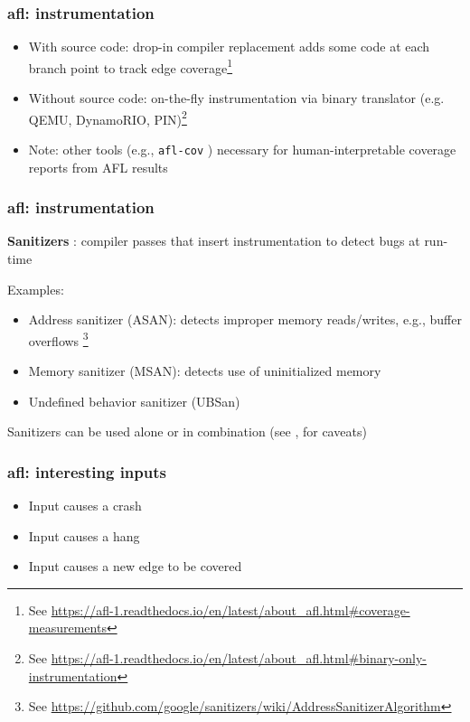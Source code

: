 \documentclass{beamer}
\begin{document}
\begin{frame}
	\frametitle{afl: instrumentation}
	
	\begin{itemize}
		\item{With source code: drop-in compiler replacement adds some code at each branch point to track edge coverage\footnote{See \url{https://afl-1.readthedocs.io/en/latest/about\_afl.html\#coverage-measurements}}}

		\item{Without source code: on-the-fly instrumentation via binary translator (e.g. QEMU, DynamoRIO, PIN)\footnote{See \url{https://afl-1.readthedocs.io/en/latest/about\_afl.html\#binary-only-instrumentation}}} 
		
		\item{Note: other tools (e.g., \texttt{afl-cov} \cite{aflcov}) necessary for human-interpretable coverage reports from AFL results}
	\end{itemize}
\end{frame}

\begin{frame}
	\frametitle{afl: instrumentation}
	\textbf{Sanitizers} \cite{sanitizers}: compiler passes that insert instrumentation to detect bugs at run-time
	
	\vspace{\baselineskip}
	Examples: \begin{itemize}
		\item{Address sanitizer (ASAN): detects improper memory reads/writes, e.g., buffer overflows \footnote{See \url{https://github.com/google/sanitizers/wiki/AddressSanitizerAlgorithm}}}
		\item{Memory sanitizer (MSAN): detects use of uninitialized memory}
		\item{Undefined behavior sanitizer (UBSan)}
	\end{itemize}

	\vspace{\baselineskip}
	Sanitizers can be used alone or in combination (see \cite{afl_asannotes}, \cite{githubseclab} for caveats)
\end{frame}


\begin{frame}
	\frametitle{afl: interesting inputs}
	\begin{itemize}
		\item{Input causes a crash}
		\item{Input causes a hang}
		\item{Input causes a new edge to be covered}
	\end{itemize}

\end{frame}
\end{document}
